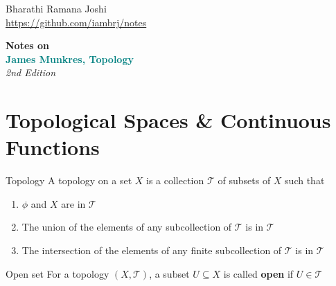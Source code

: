 \documentclass[titlepage, 12pt]{book}
\begin{document}
\begin{titlepage}

	\raggedleft

	\vspace*{\baselineskip}

	{Bharathi Ramana Joshi\\\url{https://github.com/iambrj/notes}}

	\vspace*{0.167\textheight}

    \textbf{\LARGE Notes on}\\[\baselineskip]

	\textbf{\textcolor{teal}{\huge James Munkres, Topology}}\\[\baselineskip]

    {\Large \textit{2nd Edition}}

	\vfill

	\vspace*{3\baselineskip}

\end{titlepage}

\newpage

\chapter{Topological Spaces \& Continuous Functions}

\begin{definition}{Topology}{}
 A topology on a set $X$ is a collection $\mathcal{T}$ of subsets of $X$ such
 that
 \begin{enumerate}
     \item $\phi$ and $X$ are in $\mathcal{T}$
     \item The union of the elements of any subcollection of $\mathcal{T}$ is in
         $\mathcal{T}$
     \item The intersection of the elements of any finite subcollection of
         $\mathcal{T}$ is in $\mathcal{T}$
 \end{enumerate}
\end{definition}

\begin{definition}{Open set}{}
    For a topology $(X, \mathcal{T})$, a subset $U\subseteq X$ is called
    \textbf{open} if $U\in\mathcal{T}$
\end{definition}
\end{document}
